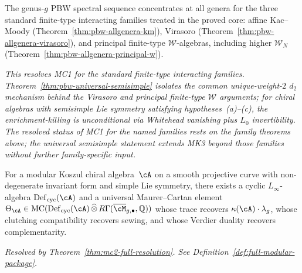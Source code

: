 \begin{theorem}\label{thm:master-pbw}
\ClaimStatusProvedHere{}
The genus-$g$ PBW spectral sequence concentrates at all genera for the
three standard finite-type interacting families treated in the proved
core: affine Kac--Moody
\textup{(}Theorem~\textup{\ref{thm:pbw-allgenera-km}}\textup{)},
Virasoro
\textup{(}Theorem~\textup{\ref{thm:pbw-allgenera-virasoro}}\textup{)},
and principal finite-type $\mathcal{W}$-algebras, including higher
$\mathcal{W}_N$
\textup{(}Theorem~\textup{\ref{thm:pbw-allgenera-principal-w}}\textup{)}.

\emph{This resolves MC1 for the standard finite-type interacting
families.  Theorem~\textup{\ref{thm:pbw-universal-semisimple}}
isolates the common unique-weight-$2$ $d_2$ mechanism behind the
Virasoro and principal finite-type $\mathcal{W}$ arguments; for chiral
algebras with semisimple Lie symmetry satisfying
hypotheses~\textup{(a)--(c)}, the enrichment-killing is unconditional
via Whitehead vanishing plus $L_0$ invertibility.  The resolved status
of MC1 for the named families rests on the family theorems above;
the universal semisimple statement extends MK3 beyond those families
without further family-specific input.}
\end{theorem}

\begin{theorem}%
\label{thm:master-theta}
\ClaimStatusProvedHere{}
For a modular Koszul chiral algebra~$\cA$ on a smooth projective
curve with non-degenerate invariant form and simple Lie symmetry,
there exists a cyclic
$L_\infty$-algebra $\operatorname{Def}_{\mathrm{cyc}}(\cA)$ and a
universal Maurer--Cartan element
$\Theta_\cA \in \operatorname{MC}(
  \operatorname{Def}_{\mathrm{cyc}}(\cA) \,\widehat{\otimes}\,
  R\Gamma(\overline{\cM}_{g,\bullet}, \mathbb{Q}))$
whose trace recovers $\kappa(\cA) \cdot \lambda_g$, whose clutching
compatibility recovers sewing, and whose Verdier duality
recovers complementarity.

\emph{Resolved by
Theorem~\textup{\ref{thm:mc2-full-resolution}}.
See Definition~\textup{\ref{def:full-modular-package}}.}
\end{theorem}


